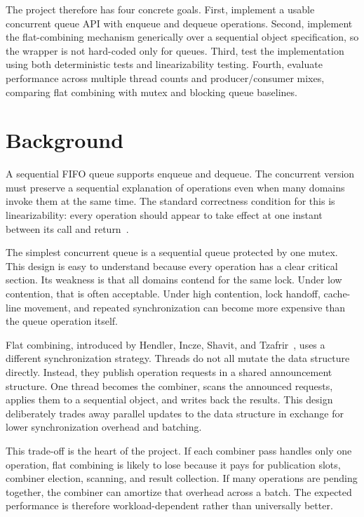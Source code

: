 \documentclass[11pt,a4paper]{article}
\begin{document}
The project therefore has four concrete goals. First, implement a usable concurrent queue API with enqueue and dequeue operations. Second, implement the flat-combining mechanism generically over a sequential object specification, so the wrapper is not hard-coded only for queues. Third, test the implementation using both deterministic tests and linearizability testing. Fourth, evaluate performance across multiple thread counts and producer/consumer mixes, comparing flat combining with mutex and blocking queue baselines.

\section{Background}
A sequential FIFO queue supports enqueue and dequeue. The concurrent version must preserve a sequential explanation of operations even when many domains invoke them at the same time. The standard correctness condition for this is linearizability: every operation should appear to take effect at one instant between its call and return~\cite{AoMPP}.

The simplest concurrent queue is a sequential queue protected by one mutex. This design is easy to understand because every operation has a clear critical section. Its weakness is that all domains contend for the same lock. Under low contention, that is often acceptable. Under high contention, lock handoff, cache-line movement, and repeated synchronization can become more expensive than the queue operation itself.

Flat combining, introduced by Hendler, Incze, Shavit, and Tzafrir~\cite{flatcombining}, uses a different synchronization strategy. Threads do not all mutate the data structure directly. Instead, they publish operation requests in a shared announcement structure. One thread becomes the combiner, scans the announced requests, applies them to a sequential object, and writes back the results. This design deliberately trades away parallel updates to the data structure in exchange for lower synchronization overhead and batching.

This trade-off is the heart of the project. If each combiner pass handles only one operation, flat combining is likely to lose because it pays for publication slots, combiner election, scanning, and result collection. If many operations are pending together, the combiner can amortize that overhead across a batch. The expected performance is therefore workload-dependent rather than universally better.
\end{document}
